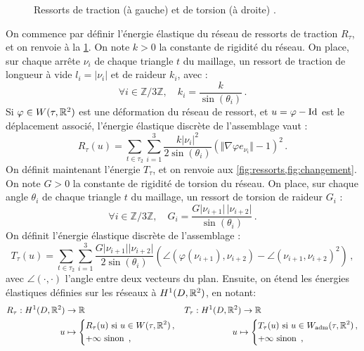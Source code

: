 \begin{figure}[H]
    \centering
    \caption{Ressorts de traction (à gauche) et de torsion (à droite) \parencite[p.184]{balasoiu2020halthesis}.}
    \label{fig:ressorts}
\end{figure}

On commence par définir l’énergie élastique du réseau de ressorts de traction $R_\tau$, et on renvoie à la \cref{fig:ressorts}. On note $k > 0$ la constante de rigidité du réseau. On place, sur chaque arrête $\nu_i$ de chaque triangle $t$ du maillage, un ressort de traction de longueur à vide $l_i = \vert \nu_i \vert$ et de raideur $k_i$, avec :
$$
\forall i \in \mathbb{Z}/3\mathbb{Z}, \quad k_i = \frac{k}{\sin(\theta_i)} \,.
$$
Si $\varphi \in W (\tau, \mathbb{R}^2)$ est une déformation du réseau de ressort, et $u = \varphi -
\text{Id}$ est le déplacement associé, l’énergie élastique discrète de l’assemblage vaut :
$$
R_{\tau}(u) = \sum_{t\in \tau_2} \sum_{i=1}^{3} \frac{k \vert \nu_i \vert^2}{2 \sin(\theta_i)} \left( \Vert \nabla \varphi e_{\nu_i} \Vert - 1 \right)^2 \,.
$$
On définit maintenant l’énergie $T_\tau$, et on renvoie aux \cref{fig:ressorts,fig:changement}.
On note $G > 0$ la constante de rigidité de torsion du réseau. On place, sur chaque angle
$\theta_i$ de chaque triangle $t$ du maillage, un ressort de torsion de raideur $G_i$ :
$$
\forall i \in \mathbb{Z}/3\mathbb{Z}, \quad G_i = \frac{G \vert\nu_{i+1} \vert \, \vert\nu_{i+2}
    \vert}{\sin(\theta_i)} \,.
$$
On définit l’énergie élastique discrète de l’assemblage :
$$
T_\tau (u) = \sum_{t\in \tau_2} \sum_{i=1}^{3} \frac{G \vert\nu_{i+1} \vert \vert\nu_{i+2} \vert}{2\sin(\theta_i)} \left(  \angle(\varphi(\nu_{i+1}), \nu_{i+2}) - \angle(\nu_{i+1},\nu_{i+2})^2 \right) \,,
$$
avec $\angle(\cdot,\cdot)$ l’angle entre deux vecteurs du plan.
Ensuite, on étend les énergies élastiques définies sur les réseaux à $H^1(D, \mathbb{R}^2)$, en notant:
\begin{align*}
    R_\tau: H^1(D, \mathbb{R}^2) &\rightarrow \mathbb{R}  && T_\tau:
    H^1(D, \mathbb{R}^2 )  \rightarrow \mathbb{R} \\
    u &\mapsto \begin{dcases}
        R_\tau (u) \text{ si } u \in W(\tau,\mathbb{R}^2) \,, \\
        +\infty \text{ sinon } \,,
    \end{dcases}
    && \qquad \qquad \quad \,\, \, u \mapsto \begin{dcases}
        T_\tau (u) \text{ si } u \in W_{\text{\upshape adm}}(\tau,\mathbb{R}^2) \,, \\
        +\infty \text{ sinon } \,,
    \end{dcases}
\end{align*}
